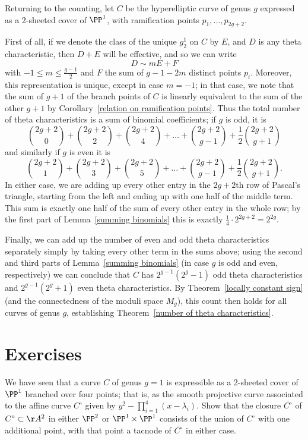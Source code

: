 Returning to the counting, let $C$ be the hyperelliptic curve of genus $g$ expressed as a 2-sheeted cover of $\PP^1$, with ramification points $p_1,\dots,p_{2g+2}$. 

First of all, if we denote the class of the unique $g^1_2$ on $C$ by $E$, and $D$ is any theta characteristic, then $D+E$ will be effective, and so we can write
$$
D \sim mE + F
$$
with $-1 \leq m \leq \frac{g-1}{2}$ and $F$ the sum of $g-1-2m$ distinct points $p_i$. Moreover, this representation is unique, except in case $m=-1$; in that case, we note that the sum of $g+1$ of the branch points of $C$ is linearly equivalent to the sum of the other $g+1$ by Corollary~\ref{relation on ramification points}. Thus the total number of theta characteristics is a sum of binomial coefficients; if $g$ is odd, it is
$$
\binom{2g+2}{0} + \binom{2g+2}{2} + \binom{2g+2}{4} + \dots + \binom{2g+2}{g-1} + \frac{1}{2}\binom{2g+2}{g+1}
$$ 
and similarly if $g$ is even it is
$$
\binom{2g+2}{1} + \binom{2g+2}{3} + \binom{2g+2}{5} + \dots + \binom{2g+2}{g-1} + \frac{1}{2}\binom{2g+2}{g+1}.
$$ 
In either case, we are adding up every other entry in the $2g+2$th row of Pascal's triangle, starting from the left and ending up with one half of the middle term. This sum is exactly one half of the sum of every other entry in the whole row; by the first part of Lemma~\ref{summing binomials} this is exactly $\frac{1}{4} \cdot 2^{2g+2} = 2^{2g}$.

Finally, we can add up the number of even and odd theta characteristics separately simply by taking every other term in the sums above; using the second and third parts of Lemma~\ref{summing binomials} (in case $g$ is odd and even, respectively) we can conclude that $C$ has $2^{g-1}(2^g-1)$ odd theta characteristics and $2^{g-1}(2^g+1)$ even theta characteristics. By Theorem~\ref{locally constant sign} (and the connectedness of the moduli space $M_g$), this count then holds for all curves of genus $g$, establishing Theorem~\ref{number of theta characteristics}.

\section{Exercises}
 \begin{exercise}
  We have seen that a curve $C$ of genus $g=1$ is expressible as a 2-sheeted cover of $\PP^1$ branched over four points; that is, as the smooth projective curve associated to the affine curve $C^\circ$ given by $y^2 - \prod_{i=1}^4 (x-\lambda_i)$. Show that the closure $\overline{C^\circ}$ of $C^\circ \subset \AA^2$ in either $\PP^2$ or $\PP^1 \times \PP^1$ consists of the union of $C^\circ$ with one additional point, with that point a tacnode of $\overline{C^\circ}$ in either case.
  
  \end{exercise}

